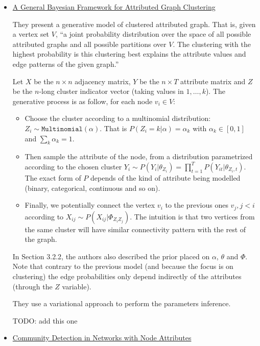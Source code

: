 \iffalse
\begin{itemize}[leftmargin=*]
\item \href{http://dl.acm.org/citation.cfm?id=2629616}{A General Bayesian
  Framework for Attributed Graph Clustering}~\autocite{Xu2014}

They present a generative model of clustered attributed graph. That is, given a
vertex set $V$, \enquote{a joint probability distribution over the space of all
possible attributed graphs and all possible partitions over $V$. The
clustering with the highest probability is this clustering best explains the
attribute values and edge patterns of the given graph.}

Let $X$ be the $n\times n$ adjacency matrix, $Y$ be the $n\times T$ attribute
matrix and $Z$ be the $n$-long cluster indicator vector (taking values in
${1,\ldots,k}$). The generative process is as follow, for each node $v_i\in V$:

\begin{itemize}
\item
  Choose the cluster according to a multinomial distribution:
  $Z_i \sim \mathtt{Multinomial}(\alpha)$. That is
  $P(Z_i = k|\alpha) = \alpha_k$ with $\alpha_k \in [0,1]$ and
  $\sum_k \alpha_k = 1$.
\item
  Then sample the attribute of the node, from a distribution
  parametrized according to the chosen cluster
  $Y_i \sim P(Y_i |\theta_{Z_i}) = \prod_{t=1}^{T} P(Y_{it}|\theta_{Z_{i},t})$.
  The exact form of $P$ depends of the kind of attribute being
  modelled (binary, categorical, continuous and so on).
\item
  Finally, we potentially connect the vertex $v_i$ to the previous
  ones ${v_j, j<i}$ according to
  $X_{ij} \sim P(X_{ij} |\Phi_{Z_iZ_j})$. The intuition is that two
  vertices from the same cluster will have similar connectivity pattern
  with the rest of the graph.
\end{itemize}

In Section 3.2.2, the authors also described the prior placed on $\alpha$,
$\theta$ and $\Phi$. Note that contrary to the previous model (and because the
focus is on clustering) the edge probabilities only depend indirectly of the
attributes (through the $Z$ variable).

They use a variational approach to perform the parameters inference.


TODO: add this one 


\item \href{https://cs.stanford.edu/people/jure/pubs/cesna-icdm13.pdf}{Community
  Detection in Networks with Node Attributes}~\autocite{Yang2013}


\end{itemize}

